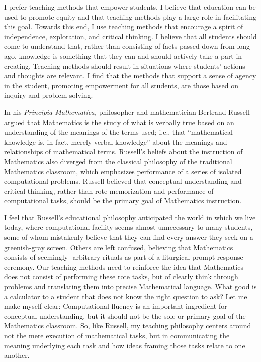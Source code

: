 \documentclass[11pt]{article}
\begin{document}

\makeletterhead

\maketitle

\vfill

I prefer teaching methods that empower students. I believe that
education can be used to promote equity and that teaching methods play a
large role in facilitating this goal. Towards this end, I use teaching
methods that encourage a spirit of independence, exploration, and
critical thinking. I believe that all students should come to understand
that, rather than consisting of facts passed down from long ago,
knowledge is something that they can and should actively take a part in
creating. Teaching methods should result in situations where students'
actions and thoughts are relevant. I find that the methods that support
a sense of agency in the student, promoting empowerment for all
students, are those based on inquiry and problem solving.

In his \emph{Principia Mathematica,} philosopher and mathematician
Bertrand Russell argued that Mathematics is the study of what is
verbally true based on an understanding of the meanings of the terms
used; i.e., that ``mathematical knowledge is, in fact, merely verbal
knowledge'' about the meanings and relationships of mathematical terms.
Russell's beliefs about the instruction of Mathematics also diverged
from the classical philosophy of the traditional Mathematics classroom,
which emphasizes performance of a series of isolated computational
problems. Russell believed that conceptual understanding and critical
thinking, rather than rote memorization and performance of computational
tasks, should be the primary goal of Mathematics instruction.

I feel that Russell's educational philosophy anticipated the world in
which we live today, where computational facility seems almost
unnecessary to many students, some of whom mistakenly believe that they
can find every answer they seek on a greenish-gray screen. Others are
left confused, believing that Mathematics consists of seemingly-%
arbitrary rituals as part of a liturgical prompt-response ceremony. Our
teaching methods need to reinforce the idea that Mathematics does not
consist of performing these rote tasks, but of clearly think through
problems and translating them into precise Mathematical language. What
good is a calculator to a student that does not know the right question
to ask? Let me make myself clear: Computational fluency is an important
ingredient for conceptual understanding, but it should not be the sole
or primary goal of the Mathematics classroom. So, like Russell, my
teaching philosophy centers around not the mere execution of
mathematical tasks, but in communicating the meaning underlying each
task and how ideas framing those tasks relate to one another.
\end{document}
